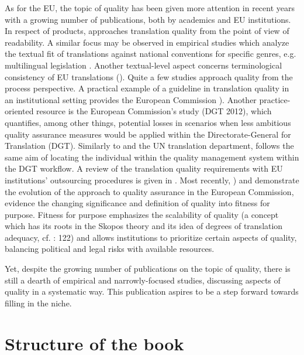 \documentclass[output=paper]{langsci/langscibook}
\begin{document}
As for the EU, the topic of quality has been given more attention in recent years with a growing number of publications, both by academics and EU institutions. In respect of products, \citet[104-106]{Koskinen2008} approaches translation quality from the point of view of readability. A similar focus may be observed in empirical studies which analyze the textual fit of translations against national conventions for specific genres, e.g. multilingual legislation \citep{Biel2014}. Another textual-level aspect concerns terminological consistency of EU translations (\citealt{PachoAljanati2017}). Quite a few studies approach quality from the process perspective. A practical example of a guideline in translation quality in an institutional setting provides the European Commission \citet{DGT2009}). Another practice-oriented resource is the European Commission’s study (DGT 2012), which quantifies, among other things, potential losses in scenarios when less ambitious quality assurance measures would be applied within the Directorate-General for Translation (DGT). Similarly to \citet{Didaoui2009} and the UN translation department, \citet{Svoboda2008} follows the same aim of locating the individual within the quality management system within the DGT workflow. A review of the translation quality requirements with EU institutions’ outsourcing procedures is given in \citet{Sosoni2011}. Most recently, \citet{Strandvik2015,Strandvik2017,Strandvikforthcoming}) and \citet{DruganEtAlforthcoming} demonstrate the evolution of the approach to quality assurance in the European Commission, evidence the changing significance and definition of quality into fitness for purpose. Fitness for purpose emphasizes the scalability of quality (a concept which has its roots in the Skopos theory and its idea of degrees of translation adequacy, cf. \citealt{Nord2010}: 122) and allows institutions to prioritize certain aspects of quality, balancing political and legal risks with available resources. 

Yet, despite the growing number of publications on the topic of quality, there is still a dearth of empirical and narrowly-focused studies, discussing aspects of quality in a systematic way. This publication aspires to be a step forward towards filling in the niche.

\section{Structure of the book}
\end{document}
